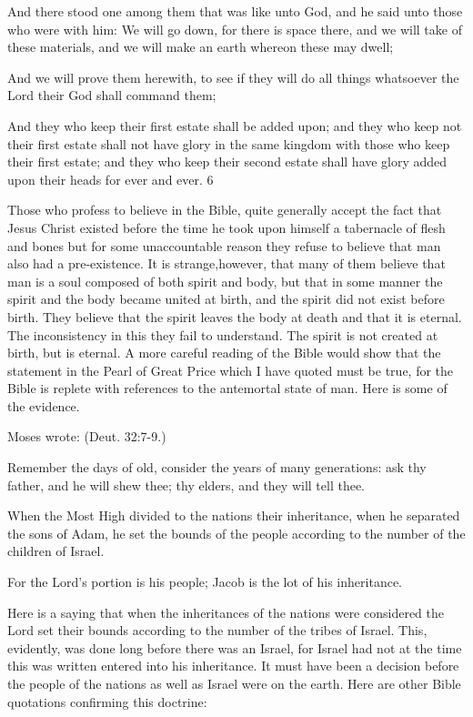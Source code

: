 And there stood one among them that was like unto God, and he said unto those who were
with him: We will go down, for there is space there, and we will take of these materials, and
we will make an earth whereon these may dwell;

And we will prove them herewith, to see if they will do all things whatsoever the Lord their
God shall command them;

And they who keep their first estate shall be added upon; and they who keep not their first
estate shall not have glory in the same kingdom with those who keep their first estate; and
they who keep their second estate shall have glory added upon their heads for ever and ever.
6

Those who profess to believe in the Bible, quite generally accept the fact that Jesus Christ
existed before the time he took upon himself a tabernacle of flesh and bones but for some
unaccountable reason they refuse to believe that man also had a pre-existence. It is
strange,however, that many of them believe that man is a soul composed of both spirit and
body, but that in some manner the spirit and the body became united at birth, and the spirit
did not exist before birth. They believe that the spirit leaves the body at death and that it is
eternal. The inconsistency in this they fail to understand. The spirit is not created at birth, but
is eternal. A more careful reading of the Bible would show that the statement in the Pearl of
Great Price which I have quoted must be true, for the Bible is replete with references to the
antemortal state of man. Here is some of the evidence.

Moses wrote: (Deut. 32:7-9.)

Remember the days of old, consider the years of many generations: ask thy father, and he
will shew thee; thy elders, and they will tell thee.

When the Most High divided to the nations their inheritance, when he separated the sons of
Adam, he set the bounds of the people according to the number of the children of Israel.

For the Lord's portion is his people; Jacob is the lot of his inheritance.

Here is a saying that when the inheritances of the nations were considered the Lord set their
bounds according to the number of the tribes of Israel. This, evidently, was done long before
there was an Israel, for Israel had not at the time this was written entered into his inheritance.
It must have been a decision before the people of the nations as well as Israel were on the
earth. Here are other Bible quotations confirming this doctrine:

